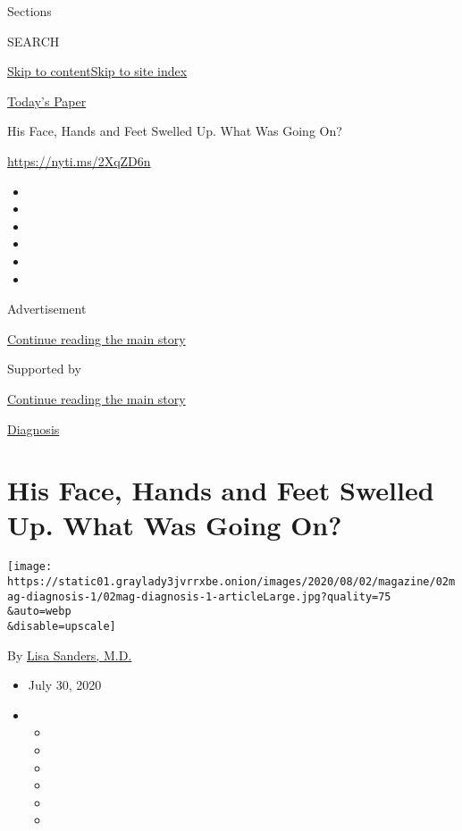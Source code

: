 Sections

SEARCH

\protect\hyperlink{site-content}{Skip to
content}\protect\hyperlink{site-index}{Skip to site index}

\href{https://myaccount.nytimes3xbfgragh.onion/auth/login?response_type=cookie\&client_id=vi}{}

\href{https://www.nytimes3xbfgragh.onion/section/todayspaper}{Today's
Paper}

His Face, Hands and Feet Swelled Up. What Was Going On?

\url{https://nyti.ms/2XqZD6n}

\begin{itemize}
\item
\item
\item
\item
\item
\item
\end{itemize}

Advertisement

\protect\hyperlink{after-top}{Continue reading the main story}

Supported by

\protect\hyperlink{after-sponsor}{Continue reading the main story}

\href{/column/diagnosis}{Diagnosis}

\hypertarget{his-face-hands-and-feet-swelled-up-what-was-going-on}{%
\section{His Face, Hands and Feet Swelled Up. What Was Going
On?}\label{his-face-hands-and-feet-swelled-up-what-was-going-on}}

\texttt{[image: https://static01.graylady3jvrrxbe.onion/images/2020/08/02/magazine/02mag-diagnosis-1/02mag-diagnosis-1-articleLarge.jpg?quality=75\\\&auto=webp\\\&disable=upscale]}

By \href{https://www.nytimes3xbfgragh.onion/by/lisa-sanders-md}{Lisa
Sanders, M.D.}

\begin{itemize}
\item
  July 30, 2020
\item
  \begin{itemize}
  \item
  \item
  \item
  \item
  \item
  \item
  \end{itemize}
\end{itemize}

